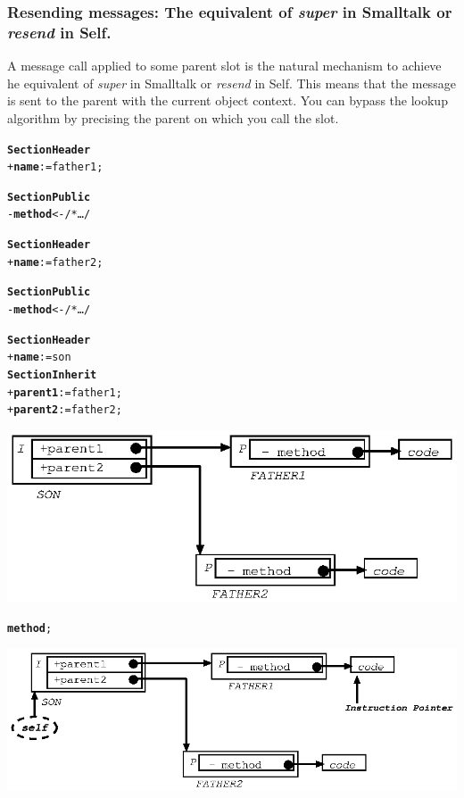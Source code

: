 \documentclass[11pt]{mybook}
\begin{document}
\subsubsection{Resending messages: The equivalent of {\it{}super} in Smalltalk or {\it{}resend} in Self.}
\label{language_reference:section_identifiers:inherit_section:resending}
%
A message call applied to some parent slot is the natural mechanism 
to achieve he equivalent of {\it{}super} in
Smalltalk or {\it{}resend} in Self. 
This means that the message is sent to the parent with the current object
context.
You can bypass the lookup algorithm by precising the parent on which you call the slot.
\begin{alltt} 
{\bf{}Section Header}
  + {\bf{}name} := {\sc{}father1};

{\bf{}Section Public}
  - {\bf{}method} <- /* \ldots */

{\bf{}Section Header}
  + {\bf{}name} := {\sc{}father2};

{\bf{}Section Public}
  - {\bf{}method} <- /* \ldots */

{\bf{}Section Header}
  + {\bf{}name} := {\sc{}son}
{\bf{}Section Inherit}
  + {\bf{}parent1} := {\sc{}father1};
  + {\bf{}parent2} := {\sc{}father2};
\end{alltt}
\begin{center}
\includegraphics[scale=1.0]{figures/resend}
\end{center}
{\tt{}{\bf{}method};}
\begin{center}
\includegraphics[scale=1.0]{figures/resend1}
\end{center}
\end{document}
